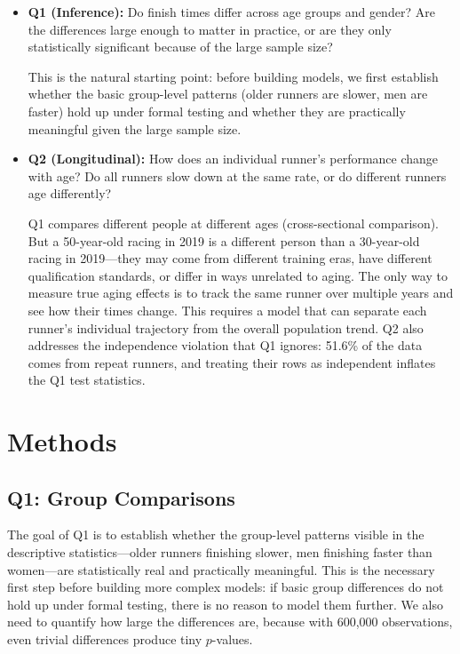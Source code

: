 \documentclass[conference]{IEEEtran}
\begin{document}
\begin{itemize}
    \item \textbf{Q1 (Inference):} Do finish times differ across age groups and gender? Are the differences large enough to matter in practice, or are they only statistically significant because of the large sample size?

    This is the natural starting point: before building models, we first establish whether the basic group-level patterns (older runners are slower, men are faster) hold up under formal testing and whether they are practically meaningful given the large sample size.

    \item \textbf{Q2 (Longitudinal):} How does an individual runner's performance change with age? Do all runners slow down at the same rate, or do different runners age differently?

    Q1 compares different people at different ages (cross-sectional comparison). But a 50-year-old racing in 2019 is a different person than a 30-year-old racing in 2019---they may come from different training eras, have different qualification standards, or differ in ways unrelated to aging. The only way to measure true aging effects is to track the same runner over multiple years and see how their times change. This requires a model that can separate each runner's individual trajectory from the overall population trend. Q2 also addresses the independence violation that Q1 ignores: 51.6\% of the data comes from repeat runners, and treating their rows as independent inflates the Q1 test statistics.
\end{itemize}

\section{Methods}

\subsection{Q1: Group Comparisons}

The goal of Q1 is to establish whether the group-level patterns visible in the descriptive statistics---older runners finishing slower, men finishing faster than women---are statistically real and practically meaningful. This is the necessary first step before building more complex models: if basic group differences do not hold up under formal testing, there is no reason to model them further. We also need to quantify how large the differences are, because with 600,000 observations, even trivial differences produce tiny $p$-values.
\end{document}
